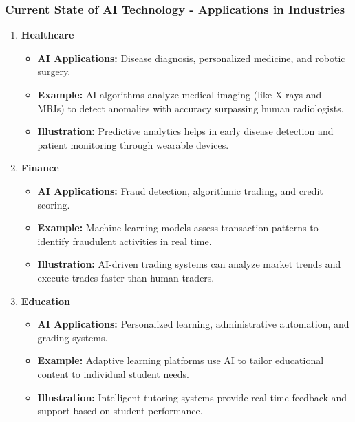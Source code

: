 \documentclass{beamer}
\begin{document}
\begin{frame}[fragile]
    \frametitle{Current State of AI Technology - Applications in Industries}
    \begin{enumerate}
        \item \textbf{Healthcare}
        \begin{itemize}
            \item \textbf{AI Applications:} Disease diagnosis, personalized medicine, and robotic surgery.
            \item \textbf{Example:} AI algorithms analyze medical imaging (like X-rays and MRIs) to detect anomalies with accuracy surpassing human radiologists.
            \item \textbf{Illustration:} Predictive analytics helps in early disease detection and patient monitoring through wearable devices.
        \end{itemize}
        
        \item \textbf{Finance}
        \begin{itemize}
            \item \textbf{AI Applications:} Fraud detection, algorithmic trading, and credit scoring.
            \item \textbf{Example:} Machine learning models assess transaction patterns to identify fraudulent activities in real time.
            \item \textbf{Illustration:} AI-driven trading systems can analyze market trends and execute trades faster than human traders.
        \end{itemize}
        
        \item \textbf{Education}
        \begin{itemize}
            \item \textbf{AI Applications:} Personalized learning, administrative automation, and grading systems.
            \item \textbf{Example:} Adaptive learning platforms use AI to tailor educational content to individual student needs.
            \item \textbf{Illustration:} Intelligent tutoring systems provide real-time feedback and support based on student performance.
        \end{itemize}
    \end{enumerate}
\end{frame}
\end{document}
